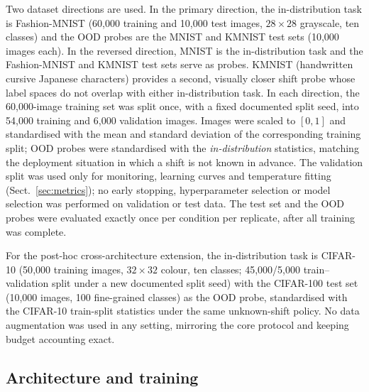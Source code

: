 \documentclass[11pt,a4paper]{article}
\begin{document}
Two dataset directions are used. In the primary direction, the
in-distribution task is Fashion-MNIST \citep{xiao2017} (60{,}000 training
and 10{,}000 test images, $28\times28$ grayscale, ten classes) and the OOD
probes are the MNIST \citep{lecun1998} and KMNIST \citep{clanuwat2018}
test sets (10{,}000 images each). In the reversed direction, MNIST is the
in-distribution task and the Fashion-MNIST and KMNIST test sets serve as
probes. KMNIST (handwritten cursive Japanese characters) provides a
second, visually closer shift probe whose label spaces do not overlap with
either in-distribution task. In each direction, the 60{,}000-image training
set was split once, with a fixed documented split seed, into 54{,}000
training and 6{,}000 validation images. Images were scaled to $[0,1]$ and
standardised with the mean and standard deviation of the corresponding
training split; OOD probes were standardised with the \emph{in-distribution}
statistics, matching the deployment situation in which a shift is not known
in advance. The validation split was used only for monitoring, learning
curves and temperature fitting (Sect.~\ref{sec:metrics}); no early
stopping, hyperparameter selection or model selection was performed on
validation or test data. The test set and the OOD probes were evaluated
exactly once per condition per replicate, after all training was complete.

For the post-hoc cross-architecture extension, the in-distribution task is
CIFAR-10 \citep{krizhevsky2009} (50{,}000 training images, $32\times32$
colour, ten classes; 45{,}000/5{,}000 train--validation split under a new
documented split seed) with the CIFAR-100 test set (10{,}000 images, 100
fine-grained classes) as the OOD probe, standardised with the CIFAR-10
train-split statistics under the same unknown-shift policy. No data
augmentation was used in any setting, mirroring the core protocol and
keeping budget accounting exact.

\subsection{Architecture and training}\label{sec:training}
\end{document}
